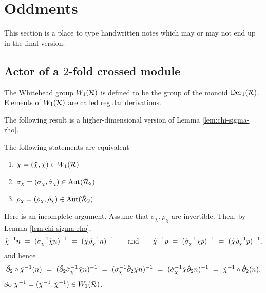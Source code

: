 
\section{Oddments}

This section is a place to type handwritten notes which may or may not 
end up in the final version.


\subsection{Actor of a $2$-fold crossed module} \label{subs:actor-xxmod}

\begin{defn}   
The Whitehead group $W_1(\mathcal{R})$ is defined to be the group of the monoid 
$\mathrm{Der}_1(\mathcal{R})$. 
Elements of $W_1(\mathcal{R})$ are called regular derivations.
\end{defn}

\noindent
The following result is a higher-dimensional version of
Lemma \ref{lem:chi-sigma-rho}.

\begin{lem} \label{lem:equiv-w1s}
The following statements are equivalent 
\begin{enumerate}[\rm (a)]
\item $\chi = (\ddot{\chi}, \dot{\chi}) \in W_1(\mathcal{R}) $
\item $\sigma_{\chi} = (\ddot{\sigma}_{\chi}, \dot{\sigma}_{\chi})  \in \mathrm{Aut}(\ddot{\mathcal{R}}_2)$
\item $ \rho_{\chi} = (\ddot{\rho}_{\chi}, \dot{\rho}_{\chi})  \in \mathrm{Aut}(\dot{\mathcal{R}}_2)$
\end{enumerate}
\end{lem}
\begin{pf}
Here is an incomplete argument.
Assume that $\sigma_{\chi}, \rho_{\chi}$ are invertible.
Then, by Lemma \ref{lem:chi-sigma-rho}, 
$$
\ddot{\chi}^{-1}n ~=~ (\ddot{\sigma}_{\chi}^{-1}\ddot{\chi} n)^{-1} 
            ~=~ (\ddot{\chi}\ddot{\rho}_{\chi}^{-1} n)^{-1}
\qquad\mbox{and}\qquad
\dot{\chi}^{-1}p ~=~ (\dot{\sigma}_{\chi}^{-1}\dot{\chi} p)^{-1} 
           ~=~ (\dot{\chi}\dot{\rho}_{\chi}^{-1} p)^{-1},
$$
and hence
$$
\ddot{\partial}_2 \circ \ddot{\chi}^{-1} (n)
~=~ (\ddot{\partial}_2 \ddot{\sigma}_{\chi}^{-1} \ddot{\chi} n)^{-1}
~=~ (\dot{\sigma}_{\chi}^{-1} \ddot{\partial}_2 \ddot{\chi} n)^{-1}
~=~ (\dot{\sigma}_{\chi}^{-1} \dot{\chi} \dot{\partial}_2 n)^{-1}
~=~ \dot{\chi}^{-1} \circ \dot{\partial}_2 (n).
$$
So $\chi^{-1} = (\ddot{\chi}^{-1},\dot{\chi}^{-1}) \in W_1(\mathcal{R})$.
\end{pf}

